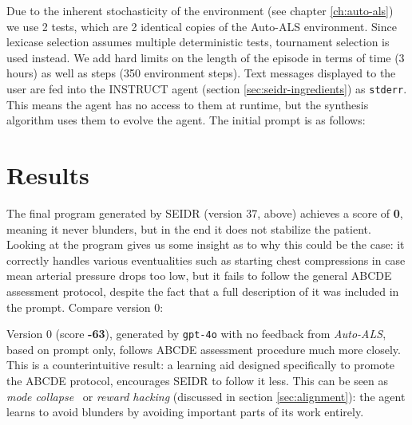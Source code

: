 Due to the inherent stochasticity of the environment (see chapter \ref{ch:auto-als}) we use 2 tests, which are 2 identical copies of the Auto-ALS environment.
Since lexicase selection assumes multiple deterministic tests, tournament selection is used instead.
We add hard limits on the length of the episode in terms of time (3 hours) as well as steps (350 environment steps).
Text messages displayed to the user are fed into the INSTRUCT agent (section \ref{sec:seidr-ingredients}) as \texttt{stderr}.
This means the agent has no access to them at runtime, but the synthesis algorithm uses them to evolve the agent.
The initial prompt is as follows:



\newpage
\section{Results}



The final program generated by SEIDR (version 37, above) achieves a score of \textbf{0}, meaning it never blunders, but in the end it does not stabilize the patient.
Looking at the program gives us some insight as to why this could be the case: it correctly handles various eventualities such as starting chest compressions in case mean arterial pressure drops too low, but it fails to follow the general ABCDE assessment protocol, despite the fact that a full description of it was included in the prompt. Compare version 0:



Version 0 (score \textbf{-63}), generated by \texttt{gpt-4o} with no feedback from \emph{Auto-ALS}, based on prompt only, follows ABCDE assessment procedure much more closely.
This is a counterintuitive result: a learning aid designed specifically to promote the ABCDE protocol, encourages SEIDR to follow it less.
This can be seen as \emph{mode collapse}~\cite{kossaleModeCollapseGenerative2022, zhangModeCollapseGenerative2021} or \emph{reward hacking} (discussed in section \ref{sec:alignment}): the agent learns to avoid blunders by avoiding important parts of its work entirely.

